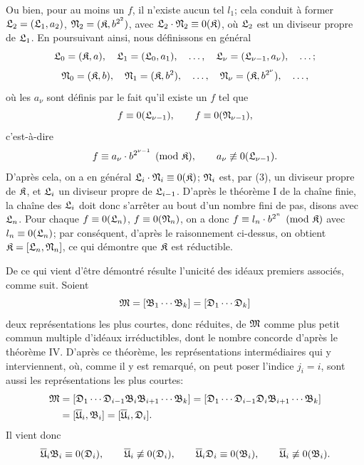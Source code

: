 Ou bien, pour au moins un $f$, il n'existe aucun tel $l_1$; cela conduit à former $\mathfrak{L}_2=(\mathfrak{L}_1,a_2)$, $\mathfrak{N}_2=(\mathfrak{K},b^{2^2})$, avec $\mathfrak{L}_2\cdot\mathfrak{N}_2\equiv0(\mathfrak{K})$, où $\mathfrak{L}_2$ est un diviseur propre de $\mathfrak{L}_1$. En poursuivant ainsi, nous définissons en général
\[
 \mathfrak{L}_0=(\mathfrak{K},a),\quad
 \mathfrak{L}_1=(\mathfrak{L}_0,a_1),\quad \ldots,\quad
 \mathfrak{L}_\nu=(\mathfrak{L}_{\nu-1},a_\nu),\quad \ldots;
\]
\[
 \mathfrak{N}_0=(\mathfrak{K},b),\quad
 \mathfrak{N}_1=(\mathfrak{K},b^2),\quad \ldots,\quad
 \mathfrak{N}_\nu=(\mathfrak{K},b^{2^\nu}),\quad \ldots,
\]
où les $a_\nu$ sont définis par le fait qu'il existe un $f$ tel que
\[
 f\equiv0(\mathfrak{L}_{\nu-1}),\qquad f\equiv0(\mathfrak{N}_{\nu-1}),
\]
c'est-à-dire
\[
 f\equiv a_\nu\cdot b^{2^{\nu-1}}\pmod{\mathfrak{K}},\qquad
 a_\nu\not\equiv0(\mathfrak{L}_{\nu-1}).
\]
D'après cela, on a en général $\mathfrak{L}_i\cdot\mathfrak{N}_i\equiv0(\mathfrak{K})$; $\mathfrak{N}_i$ est, par (3), un diviseur propre de $\mathfrak{K}$, et $\mathfrak{L}_i$ un diviseur propre de $\mathfrak{L}_{i-1}$. D'après le théorème I de la chaîne finie, la chaîne des $\mathfrak{L}_i$ doit donc s'arrêter au bout d'un nombre fini de pas, disons avec $\mathfrak{L}_n$. Pour chaque $f\equiv0(\mathfrak{L}_n)$, $f\equiv0(\mathfrak{N}_n)$, on a donc $f\equiv l_n\cdot b^{2^n}\pmod{\mathfrak{K}}$ avec $l_n\equiv0(\mathfrak{L}_n)$; par conséquent, d'après le raisonnement ci-dessus, on obtient $\mathfrak{K}=[\mathfrak{L}_n,\mathfrak{N}_n]$, ce qui démontre que $\mathfrak{K}$ est réductible.

De ce qui vient d'être démontré résulte l'unicité des idéaux premiers associés, comme suit. Soient
\[
 \mathfrak{M}=[\mathfrak{B}_1\cdots\mathfrak{B}_k]=[\mathfrak{D}_1\cdots\mathfrak{D}_k]
\]
deux représentations les plus courtes, donc réduites, de $\mathfrak{M}$ comme plus petit commun multiple d'idéaux irréductibles, dont le nombre concorde d'après le théorème IV. D'après ce théorème, les représentations intermédiaires qui y interviennent, où, comme il y est remarqué, on peut poser l'indice $j_i=i$, sont aussi les représentations les plus courtes:
\[
\begin{aligned}
 \mathfrak{M}&=[\mathfrak{D}_1\cdots\mathfrak{D}_{i-1}\mathfrak{B}_i\mathfrak{B}_{i+1}\cdots\mathfrak{B}_k]
       =[\mathfrak{D}_1\cdots\mathfrak{D}_{i-1}\mathfrak{D}_i\mathfrak{B}_{i+1}\cdots\mathfrak{B}_k]\\
       &=[\overline{\mathfrak{U}}_i,\mathfrak{B}_i]=[\overline{\mathfrak{U}}_i,\mathfrak{D}_i].
\end{aligned}
\]
Il vient donc
\[
 \overline{\mathfrak{U}}_i\mathfrak{B}_i\equiv0(\mathfrak{D}_i),\qquad
 \overline{\mathfrak{U}}_i\not\equiv0(\mathfrak{D}_i),
 \qquad
 \overline{\mathfrak{U}}_i\mathfrak{D}_i\equiv0(\mathfrak{B}_i),\qquad
 \overline{\mathfrak{U}}_i\not\equiv0(\mathfrak{B}_i).
\]

